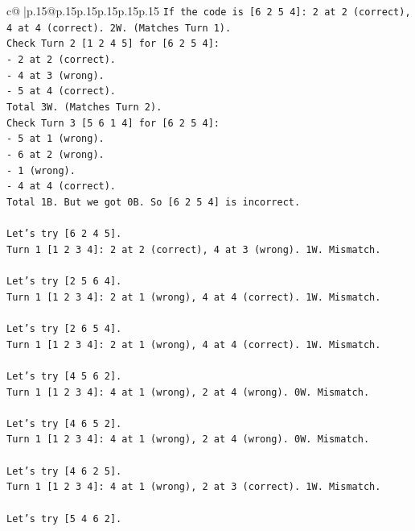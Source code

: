 \documentclass{article}
\begin{document}
{\begin{supertabular}{c@{$\;$}|p{.15\linewidth}@{}p{.15\linewidth}p{.15\linewidth}p{.15\linewidth}p{.15\linewidth}p{.15\linewidth}}
{{{\texttt{If the code is {[}6 2 5 4{]}: 2 at 2 (correct), 4 at 4 (correct). 2W. (Matches Turn 1).} \\
\texttt{Check Turn 2 {[}1 2 4 5{]} for {[}6 2 5 4{]}:} \\
\texttt{{-} 2 at 2 (correct).} \\
\texttt{{-} 4 at 3 (wrong).} \\
\texttt{{-} 5 at 4 (correct).} \\
\texttt{Total 3W. (Matches Turn 2).} \\
\texttt{Check Turn 3 {[}5 6 1 4{]} for {[}6 2 5 4{]}:} \\
\texttt{{-} 5 at 1 (wrong).} \\
\texttt{{-} 6 at 2 (wrong).} \\
\texttt{{-} 1 (wrong).} \\
\texttt{{-} 4 at 4 (correct).} \\
\texttt{Total 1B. But we got 0B. So {[}6 2 5 4{]} is incorrect.} \\
\\ 
\texttt{Let's try {[}6 2 4 5{]}.} \\
\texttt{Turn 1 {[}1 2 3 4{]}: 2 at 2 (correct), 4 at 3 (wrong). 1W. Mismatch.} \\
\\ 
\texttt{Let's try {[}2 5 6 4{]}.} \\
\texttt{Turn 1 {[}1 2 3 4{]}: 2 at 1 (wrong), 4 at 4 (correct). 1W. Mismatch.} \\
\\ 
\texttt{Let's try {[}2 6 5 4{]}.} \\
\texttt{Turn 1 {[}1 2 3 4{]}: 2 at 1 (wrong), 4 at 4 (correct). 1W. Mismatch.} \\
\\ 
\texttt{Let's try {[}4 5 6 2{]}.} \\
\texttt{Turn 1 {[}1 2 3 4{]}: 4 at 1 (wrong), 2 at 4 (wrong). 0W. Mismatch.} \\
\\ 
\texttt{Let's try {[}4 6 5 2{]}.} \\
\texttt{Turn 1 {[}1 2 3 4{]}: 4 at 1 (wrong), 2 at 4 (wrong). 0W. Mismatch.} \\
\\ 
\texttt{Let's try {[}4 6 2 5{]}.} \\
\texttt{Turn 1 {[}1 2 3 4{]}: 4 at 1 (wrong), 2 at 3 (correct). 1W. Mismatch.} \\
\\ 
\texttt{Let's try {[}5 4 6 2{]}.} \\
}}}
\end{supertabular}}
\end{document}
